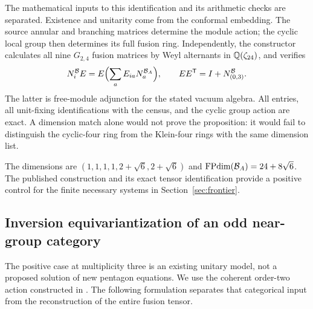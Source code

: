The mathematical inputs to this identification and its arithmetic
checks are separated. Existence and unitarity come from the conformal
embedding. The source annular and branching matrices determine the
module action; the cyclic local group then determines its full fusion
ring. Independently, the constructor calculates all nine $G_{2,4}$
fusion matrices by Weyl alternants in $\mathbb Q(\zeta_{24})$, and verifies
\[
 N_i^{\mathcal B}E
   =E\Bigl(\sum_a E_{ia}N_a^{\mathcal B_A}\Bigr),\qquad
 EE^{\mathsf T}=I+N_{(0,3)}^{\mathcal B}.
\]
The latter is free-module adjunction for the stated vacuum algebra.
All entries, all unit-fixing identifications with the census, and the
cyclic group action are exact. A dimension match alone would not prove
the proposition: it would fail to distinguish the cyclic-four ring
from the Klein-four rings with the same dimension list.

The dimensions are $(1,1,1,1,2+\sqrt6,2+\sqrt6)$ and
$\operatorname{FPdim}(\mathcal B_A)=24+8\sqrt6$. The published construction and its
exact tensor identification provide a positive control for the finite
necessary systems in Section~\ref{sec:frontier}.

\subsection{Inversion equivariantization of an odd near-group category}
\label{sec:inversion-model}
The positive case at multiplicity three is an existing unitary model,
not a proposed solution of new pentagon equations. We use the coherent
order-two action constructed in \cite[Section~13.3]{Izumi}. The following
formulation separates that categorical input from the reconstruction of
the entire fusion tensor.

